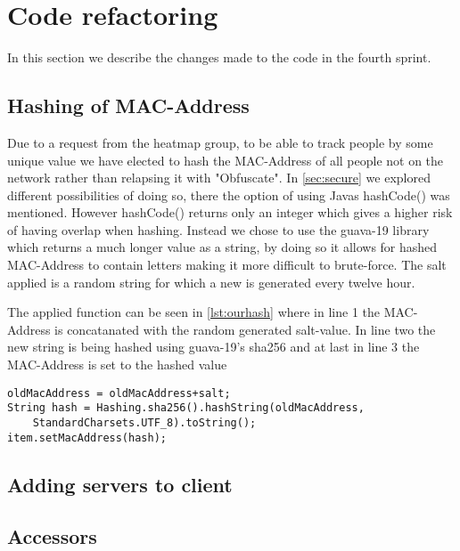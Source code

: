 \section{Code refactoring}
In this section we describe the changes made to the code in the fourth sprint.

\subsection*{Hashing of MAC-Address}
Due to a request from the heatmap group, to be able to track people by some unique value we have elected to hash the MAC-Address of all people not on the network rather than relapsing it with "Obfuscate". In \cref{sec:secure} we explored different possibilities of doing so, there the option of using Javas hashCode() was mentioned. However hashCode() returns only an integer which gives a higher risk of having overlap when hashing. Instead we chose to use the guava-19 library which returns a much longer value as a string, by doing so it allows for hashed MAC-Address to contain letters making it more difficult to brute-force. The salt applied is a random string for which a new is generated every twelve hour. 

The applied function can be seen in \cref{lst:ourhash} where in line 1 the MAC-Address is concatanated with the random generated salt-value. In line two the new string is being hashed using guava-19's sha256 and at last in line 3 the MAC-Address is set to the hashed value

\begin{lstlisting}[caption={Hashing a MAC-Address},label={lst:ourhash},language=inc_Java]
oldMacAddress = oldMacAddress+salt;
String hash = Hashing.sha256().hashString(oldMacAddress, 
	StandardCharsets.UTF_8).toString();
item.setMacAddress(hash);
\end{lstlisting}

\subsection*{Adding servers to client}

\subsection*{Accessors}